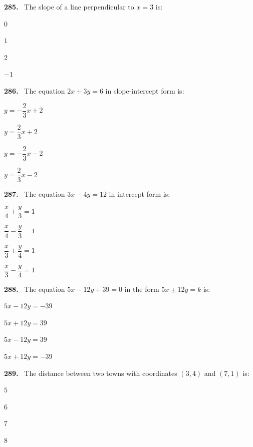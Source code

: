 \documentclass[11pt]{article}
\newenvironment{qenv}[1]{%
  \par\medskip\noindent\textbf{#1.}\ \ignorespaces
}{\par}
\begin{document}
\begin{qenv}{285} The slope of a line perpendicular to $x=3$ is:
\begin{options} \item $0$ \item $1$ \item $2$ \item $-1$ \end{options} \end{qenv}

\begin{qenv}{286} The equation $2x+3y=6$ in slope-intercept form is:
\begin{options} \item $y=-\dfrac{2}{3}x+2$ \item $y=\dfrac{2}{3}x+2$ \item $y=-\dfrac{2}{3}x-2$ \item $y=\dfrac{2}{3}x-2$ \end{options} \end{qenv}

\begin{qenv}{287} The equation $3x-4y=12$ in intercept form is:
\begin{options} \item $\dfrac{x}{4}+\dfrac{y}{3}=1$ \item $\dfrac{x}{4}-\dfrac{y}{3}=1$ \item $\dfrac{x}{3}+\dfrac{y}{4}=1$ \item $\dfrac{x}{3}-\dfrac{y}{4}=1$ \end{options} \end{qenv}

\begin{qenv}{288} The equation $5x-12y+39=0$ in the form $5x \pm 12y = k$ is:
\begin{options} \item $5x-12y=-39$ \item $5x+12y=39$ \item $5x-12y=39$ \item $5x+12y=-39$ \end{options} \end{qenv}

\begin{qenv}{289} The distance between two towns with coordinates $(3,4)$ and $(7,1)$ is:
\begin{options} \item $5$ \item $6$ \item $7$ \item $8$ \end{options} \end{qenv}
\end{document}
